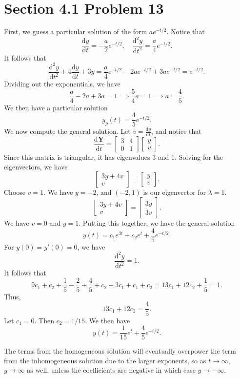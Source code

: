 \documentclass[11pt, letterpaper]{report}
\begin{document}
\section*{Section 4.1 Problem 13}
First, we guess a particular solution of the form $ae^{-t/2}$. Notice that
\[
	\frac{\mathrm{d}y}{\mathrm{d}t} =-\frac{a}{2}e^{-t / 2},\quad \frac{\mathrm{d}^2y}{\mathrm{d}t^2} =\frac{a}{4}e^{-t /2}
.\]
It follows that
\[
	\frac{\mathrm{d}^2y}{\mathrm{d}t^2} +4 \frac{\mathrm{d}y}{\mathrm{d}t} +3y=\frac{a}{4}e^{-t /2}-2ae^{-t / 2}+3ae^{-t /2}=e^{-t /2}
.\]
Dividing out the exponentials, we have
\[
	\frac{a}{4}-2a+3a=1\implies \frac{5}{4}a=1\implies a=\frac{4}{5}
.\]
We then have a particular solution
\[
	y_p(t)=\frac{4}{5}e^{-t /2}
.\]
We now compute the general solution. Let $v=\frac{\mathrm{d}y}{\mathrm{d}t} $, and notice that
\[
	\frac{\mathrm{d}\mathbf{Y}}{\mathrm{d}t} =\begin{bmatrix} 3&4 \\ 0&1 \end{bmatrix} \begin{bmatrix} y \\ v \end{bmatrix} 
.\]
Since this matrix is triangular, it has eigenvalues 3 and 1. Solving for the eigenvectors, we have
\[
	\begin{bmatrix} 3y+4v \\ v \end{bmatrix} =\begin{bmatrix} y \\ v \end{bmatrix}
.\]
Choose $v=1$. We have $y=-2$, and $(-2,1)$ is our eigenvector for $\lambda =1$.
\[
	\begin{bmatrix} 3y+4v \\ v \end{bmatrix} =\begin{bmatrix} 3y \\ 3v \end{bmatrix} 
.\]
We have $v=0$ and $y=1$. Putting this together, we have the general solution
\[
	y(t)=c_1e^{3t}+c_2e^{t}+\frac{4}{5}e^{-t /2}
.\]
For $y(0)=y'(0)=0$, we have
\[
	\frac{\mathrm{d}^2y}{\mathrm{d}t^2} =1
.\]
It follows that
\[
	9c_1+c_2+\frac{1}{5}-\frac{2}{5}+\frac{4}{5}+c_2+3c_1+c_1+c_2=13c_1+12c_2+\frac{1}{5}=1
.\]
Thus,
\[
	13c_1+12c_2=\frac{4}{5}
.\]
Let $c_1=0$. Then $c_2=1 / 15$. We then have
\[
	y(t)=\frac{1}{15}e^{t}+\frac{4}{5}e^{-t /2}
.\]

The terms from the homogeneous solution will eventually overpower the term from the inhomogeneous solution due to the larger exponents, so as $t\to \infty$, $y\to \infty$ as well, unless the coefficients are negative in which case $y\to -\infty$.
\end{document}
